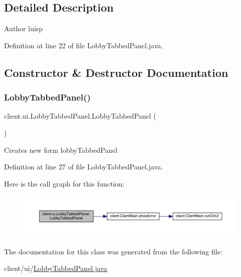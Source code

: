 \subsection{Detailed Description}
\begin{DoxyAuthor}{Author}
luisp 
\end{DoxyAuthor}


Definition at line 22 of file Lobby\+Tabbed\+Panel.\+java.



\subsection{Constructor \& Destructor Documentation}
\hypertarget{classclient_1_1ui_1_1_lobby_tabbed_panel_ace5183afecd36f1f1cc30483249ee952}{}\label{classclient_1_1ui_1_1_lobby_tabbed_panel_ace5183afecd36f1f1cc30483249ee952} 
\subsubsection{\texorpdfstring{Lobby\+Tabbed\+Panel()}{LobbyTabbedPanel()}}
{\footnotesize\ttfamily client.\+ui.\+Lobby\+Tabbed\+Panel.\+Lobby\+Tabbed\+Panel (\begin{DoxyParamCaption}{ }\end{DoxyParamCaption})}

Creates new form lobby\+Tabbed\+Panel 

Definition at line 27 of file Lobby\+Tabbed\+Panel.\+java.

Here is the call graph for this function\+:
\nopagebreak
\begin{figure}[H]
\begin{center}
\leavevmode
\includegraphics[width=350pt]{classclient_1_1ui_1_1_lobby_tabbed_panel_ace5183afecd36f1f1cc30483249ee952_cgraph}
\end{center}
\end{figure}


The documentation for this class was generated from the following file\+:\begin{DoxyCompactItemize}
\item 
client/ui/\hyperlink{_lobby_tabbed_panel_8java}{Lobby\+Tabbed\+Panel.\+java}\end{DoxyCompactItemize}
